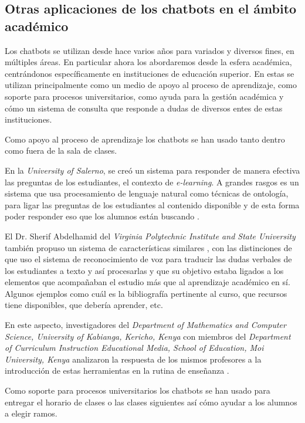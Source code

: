     \subsection{Otras aplicaciones de los chatbots en el ámbito académico}
    \par Los chatbots se utilizan desde hace varios años para variados y diversos fines, en múltiples áreas. En particular ahora los abordaremos desde la esfera académica, centrándonos específicamente en instituciones de educación superior.
    En estas se utilizan principalmente como un medio de apoyo al proceso de aprendizaje, como soporte para procesos universitarios, como ayuda para la gestión académica y cómo un sistema de consulta que responde a dudas de diversos entes de estas instituciones.
    \par Como apoyo al proceso de aprendizaje los chatbots se han usado tanto dentro como fuera de la sala de clases.
    \par En la \textit{University of Salerno}, se creó un sistema para responder de manera efectiva las preguntas de los estudiantes, el contexto de \textit{e-learning}. A grandes rasgos es un sistema que usa procesamiento de lenguaje natural como técnicas de ontología, para ligar las preguntas de los estudiantes al contenido disponible y de esta forma poder responder eso que los alumnos están buscando \cite{Clarizia2018}.
    \par El Dr. Sherif Abdelhamid del \textit{Virginia Polytechnic Institute and State University} también propuso un sistema de características similares \cite{Abdelhamid2020}, con las distinciones de que uso el sistema de reconocimiento de voz para traducir las dudas verbales de los estudiantes a texto y así procesarlas y que su objetivo estaba ligados a los elementos que acompañaban el estudio más que al aprendizaje académico en sí. Algunos ejemplos como cuál es la bibliografía pertinente al curso, que recursos tiene disponibles, que debería aprender, etc.
    \par En este aspecto, investigadores del \textit{Department of Mathematics and Computer Science, University of Kabianga, Kericho, Kenya} con miembros del \textit{Department of Curriculum Instruction Educational Media, School of Education, Moi University, Kenya} analizaron la respuesta de los mismos profesores a la introducción de estas herramientas en la rutina de enseñanza \cite{K2018}.
    
    \par Como soporte para procesos universitarios los chatbots se han usado para entregar el horario de clases o las clases siguientes así cómo ayudar a los alumnos a elegir ramos.
    
